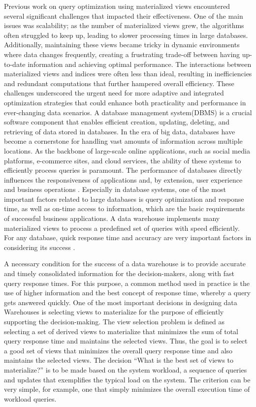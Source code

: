Previous work on query optimization using materialized views encountered several significant challenges that impacted their effectiveness. One of the main issues was scalability; as the number of materialized views grew, the algorithms often struggled to keep up, leading to slower processing times in large databases. Additionally, maintaining these views became tricky in dynamic environments where data changes frequently, creating a frustrating trade-off between having up-to-date information and achieving optimal performance. The interactions between materialized views and indices were often less than ideal, resulting in inefficiencies and redundant computations that further hampered overall efficiency. These challenges underscored the urgent need for more adaptive and integrated optimization strategies that could enhance both practicality and performance in ever-changing data scenarios.
A database management system(DBMS) is a crucial software component that enables efficient creation, updating, deleting, and retrieving of data stored in databases. In the era of big data, databases have become a cornerstone for handling vast amounts of information across multiple locations. As the backbone of large-scale online applications, such as social media platforms, e-commerce sites, and cloud services, the ability of these systems to efficiently process queries is paramount. The performance of databases directly influences the responsiveness of applications and, by extension, user experience and business operations \cite{4}. Especially in database systems, one of the most important factors related to large databases is query optimization and response time, as well as on-time access to information, which are the basic requirements of successful business applications. A data warehouse implements many materialized views to process a predefined set of queries with speed efficiently. For any database, quick response time and accuracy are very important factors in considering its success \cite{karde2010selection}.

A necessary condition for the success of a data warehouse is to provide accurate and timely consolidated information for the decision-makers, along with fast query response times. For this purpose, a common method used in practice is the use of higher information and the best concept of response time, whereby a query gets answered quickly. One of the most important decisions in designing data Warehouses is selecting views to materialize for the purpose of efficiently supporting the decision-making. The view selection problem is defined as selecting a set of derived views to materialize that minimizes the sum of total query response time and maintains the selected views. Thus, the goal is to select a good set of views that minimizes the overall query response time and also maintains the selected views. The decision ``What is the best set of views to materialize?'' is to be made based on the system workload, a sequence of queries and updates that exemplifies the typical load on the system. The criterion can be very simple, for example, one that simply minimizes the overall execution time of workload queries.\vspace{.4cm}

